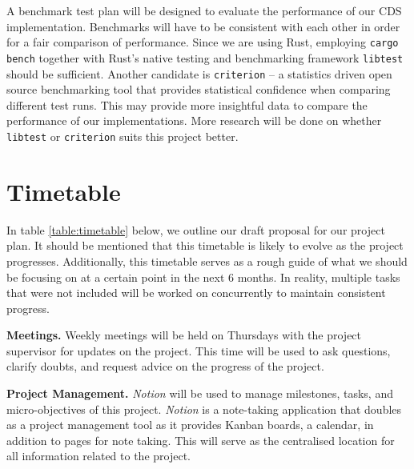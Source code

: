 \documentclass[a4paper,fleqn,12pt]{article}
\begin{document}
A benchmark test plan will be designed to evaluate the performance of our CDS implementation. Benchmarks will have to be consistent with each other in order for a fair comparison of performance. Since we are using Rust, employing \texttt{cargo bench} \cite{cargobench} together with Rust's native testing and benchmarking framework \texttt{libtest} should be sufficient. Another candidate is \texttt{criterion} -- a statistics driven open source benchmarking tool that provides statistical confidence when comparing different test runs. This may provide more insightful data to compare the performance of our implementations. More research will be done on whether \texttt{libtest} or \texttt{criterion} suits this project better.

\section{Timetable}

In table \ref{table:timetable} below, we outline our draft proposal for our project plan. It should be mentioned that this timetable is likely to evolve as the project progresses. Additionally, this timetable serves as a rough guide of what we should be focusing on at a certain point in the next 6 months. In reality, multiple tasks that were not included will be worked on concurrently to maintain consistent progress. 

\textbf{Meetings.} Weekly meetings will be held on Thursdays with the project supervisor for updates on the project. This time will be used to ask questions, clarify doubts, and request advice on the progress of the project. 

\textbf{Project Management.} \textit{Notion} will be used to manage milestones, tasks, and micro-objectives of this project. \textit{Notion} is a note-taking application that doubles as a project management tool as it provides Kanban boards, a calendar, in addition to pages for note taking. This will serve as the centralised location for all information related to the project. 
\end{document}

